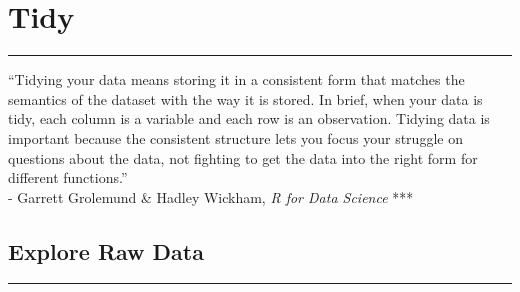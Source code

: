 \documentclass[
]{book}
\begin{document}
\hypertarget{tidy}{%
\chapter{Tidy}\label{tidy}}

\begin{center}\rule{0.5\linewidth}{0.5pt}\end{center}

``Tidying your data means storing it in a consistent form that matches the semantics of the dataset with the way it is stored. In brief, when your data is tidy, each column is a variable and each row is an observation. Tidying data is important because the consistent structure lets you focus your struggle on questions about the data, not fighting to get the data into the right form for different functions.''\\
- Garrett Grolemund \& Hadley Wickham, \emph{R for Data Science}
***

\hypertarget{explore-raw-data}{%
\section{Explore Raw Data}\label{explore-raw-data}}

\begin{center}\rule{0.5\linewidth}{0.5pt}\end{center}
\end{document}

